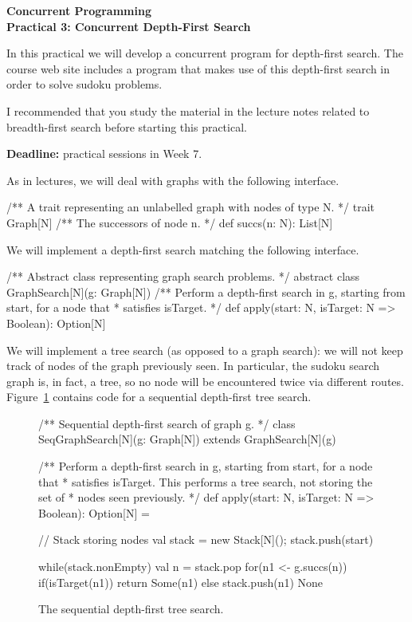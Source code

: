 \documentclass[12pt,a4paper]{article}
\begin{document}
\begin{center}
\LARGE\bf Concurrent Programming \\
Practical 3: Concurrent Depth-First Search
\end{center}

In this practical we will develop a concurrent program for depth-first
search.  The course web site includes a program that makes use of this
depth-first search in order to solve sudoku problems.

I recommended that you study the material in the lecture notes related to
breadth-first search before starting this practical.

\textbf{Deadline: } practical sessions in Week 7.

As in lectures, we will deal with graphs with the following interface.
\begin{scala}
/** A trait representing an unlabelled graph with nodes of type N. */
trait Graph[N]{
  /** The successors of node n. */
  def succs(n: N): List[N]
}
\end{scala}
%
We will implement a depth-first search matching the following interface.
%
\begin{scala}
/** Abstract class representing graph search problems. */
abstract class GraphSearch[N](g: Graph[N]){
  /** Perform a depth-first search in g, starting from start, for a node that
    * satisfies isTarget. */
  def apply(start: N, isTarget: N => Boolean): Option[N]
}
\end{scala}

We will implement a tree search (as opposed to a graph search): we will not
keep track of nodes of the graph previously seen.  In particular, the sudoku
search graph is, in fact, a tree, so no node will be encountered twice via
different routes.  Figure~\ref{fig:dfs} contains code for a sequential
depth-first tree search.
%
\begin{figure}
\begin{scala}
/** Sequential depth-first search of graph g. */
class SeqGraphSearch[N](g: Graph[N]) extends GraphSearch[N](g){
  /** Perform a depth-first search in g, starting from start, for a node that
    * satisfies isTarget.  This performs a tree search, not storing the set of
    * nodes seen previously. */
  def apply(start: N, isTarget: N => Boolean): Option[N] = {
    // Stack storing nodes
    val stack = new Stack[N](); stack.push(start)

    while(stack.nonEmpty){
      val n = stack.pop
      for(n1 <- g.succs(n)){
        if(isTarget(n1)) return Some(n1) else stack.push(n1)
      }
    }
    None
  }
}
\end{scala}
\caption{The sequential depth-first tree search.}
\label{fig:dfs}
\end{figure}
\end{document}
